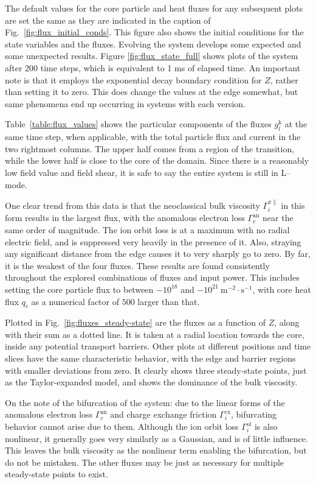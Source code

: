 The default values for the core particle and heat fluxes for any subsequent plots are set the same as they are indicated in the caption of Fig.~\ref{fig:flux_initial_conds}.
This figure also shows the initial conditions for the state variables and the fluxes.
Evolving the system develops some expected and some unexpected results.
Figure \ref{fig:flux_state_full} shows plots of the system after 200 time steps, which is equivalent to 1 ms of elapsed time.
An important note is that it employs the exponential decay boundary condition for $Z$, rather than setting it to zero.
This does change the values at the edge somewhat, but same phenomena end up occurring in systems with each version.

Table~\ref{table:flux_values} shows the particular components of the fluxes $g_l^\text{k}$ at the same time step, when applicable, with the total particle flux and current in the two rightmost columns.
The upper half comes from a region of the transition, while the lower half is close to the core of the domain.
Since there is a reasonably low field value and field shear, it is safe to say the entire system is still in L--mode.

One clear trend from this data is that the neoclassical bulk viscosity $\Gamma_i^{\pi\parallel}$ in this form results in the largest flux, with the anomalous electron loss $\Gamma_e^\text{an}$ near the same order of magnitude.
The ion orbit loss is at a maximum with no radial electric field, and is suppressed very heavily in the presence of it.
Also, straying any significant distance from the edge causes it to very sharply go to zero.
By far, it is the weakest of the four fluxes.
These results are found consistently throughout the explored combinations of fluxes and input power.
This includes setting the core particle flux to between $-10^{18}$ and $-10^{21}~\text{m}^{-2}\cdot\text{s}^{-1}$, with core heat flux $q_c$ as a numerical factor of $500$ larger than that.

Plotted in Fig.~\ref{fig:fluxes_steady-state} are the fluxes as a function of $Z$, along with their sum as a dotted line.
It is taken at a radial location towards the core, inside any potential transport barriers.
Other plots at different positions and time slices have the same characteristic behavior, with the edge and barrier regions with smaller deviations from zero.
It clearly shows three steady-state points, just as the Taylor-expanded model, and shows the dominance of the bulk viscosity.

On the note of the bifurcation of the system: due to the linear forms of the anomalous electron loss $\Gamma_e^\text{an}$ and charge exchange friction $\Gamma_i^\text{cx}$, bifurcating behavior cannot arise due to them.
Although the ion orbit loss $\Gamma_i^\text{ol}$ is also nonlinear, it generally goes very similarly as a Gaussian, and is of little influence.
This leaves the bulk viscosity as the nonlinear term enabling the bifurcation, but do not be mistaken.
The other fluxes may be just as necessary for multiple steady-state points to exist.

